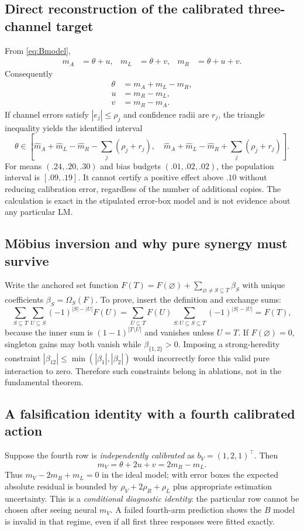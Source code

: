 \documentclass[11pt,a4paper]{article}
\theoremstyle{definition}\newtheorem{definition}[theorem]{Definition}
\theoremstyle{remark}\newtheorem{remark}[theorem]{Remark}
\begin{document}
\subsection{Direct reconstruction of the calibrated three-channel target}
From \cref{eq:Bmodel},
\begin{align*}
 m_A&=\theta+u,&m_L&=\theta+v,&m_R&=\theta+u+v.
\end{align*}
Consequently
\begin{align*}
 \theta&=m_A+m_L-m_R,\\
 u&=m_R-m_L,\\
 v&=m_R-m_A.
\end{align*}
If channel errors satisfy $|e_j|\le\rho_j$ and confidence radii are $r_j$, the triangle inequality yields the identified interval
\begin{equation}\label{eq:interval}
 \theta\in\left[\widehat m_A+\widehat m_L-\widehat m_R-\sum_j(\rho_j+r_j),\quad
 \widehat m_A+\widehat m_L-\widehat m_R+\sum_j(\rho_j+r_j)\right].
\end{equation}
For means $(.24,.20,.30)$ and bias budgets $(.01,.02,.02)$, the population interval is $[.09,.19]$. It cannot certify a positive effect above $.10$ without reducing calibration error, regardless of the number of additional copies. The calculation is exact in the stipulated error-box model and is not evidence about any particular LM.

\subsection{M\"obius inversion and why pure synergy must survive}
Write the anchored set function $F(T)=F(\varnothing)+\sum_{\varnothing\ne S\subseteq T}\beta_S$ with unique coefficients $\beta_S=\Omega_S(F)$. To prove, insert the definition and exchange sums:
\[
 \sum_{S\subseteq T}\sum_{U\subseteq S}(-1)^{|S|-|U|}F(U)
 =\sum_{U\subseteq T}F(U)\sum_{S:U\subseteq S\subseteq T}(-1)^{|S|-|U|}=F(T),
\]
because the inner sum is $(1-1)^{|T\setminus U|}$ and vanishes unless $U=T$. If $F(\varnothing)=0$, singleton gains may both vanish while $\beta_{\{1,2\}}>0$. Imposing a strong-heredity constraint $|\beta_{12}|\le\min(|\beta_1|,|\beta_2|)$ would incorrectly force this valid pure interaction to zero. Therefore such constraints belong in ablations, not in the fundamental theorem.

\subsection{A falsification identity with a fourth calibrated action}
Suppose the fourth row is \emph{independently calibrated} as $b_V=(1,2,1)^\top$. Then
\[
 m_V=\theta+2u+v = 2m_R-m_L.
\]
Thus $m_V-2m_R+m_L=0$ in the ideal model; with error boxes the expected absolute residual is bounded by $\rho_V+2\rho_R+\rho_L$ plus appropriate estimation uncertainty. This is a \emph{conditional diagnostic identity}: the particular row cannot be chosen after seeing neural $m_V$. A failed fourth-arm prediction shows the $B$ model is invalid in that regime, even if all first three responses were fitted exactly.
\end{document}
